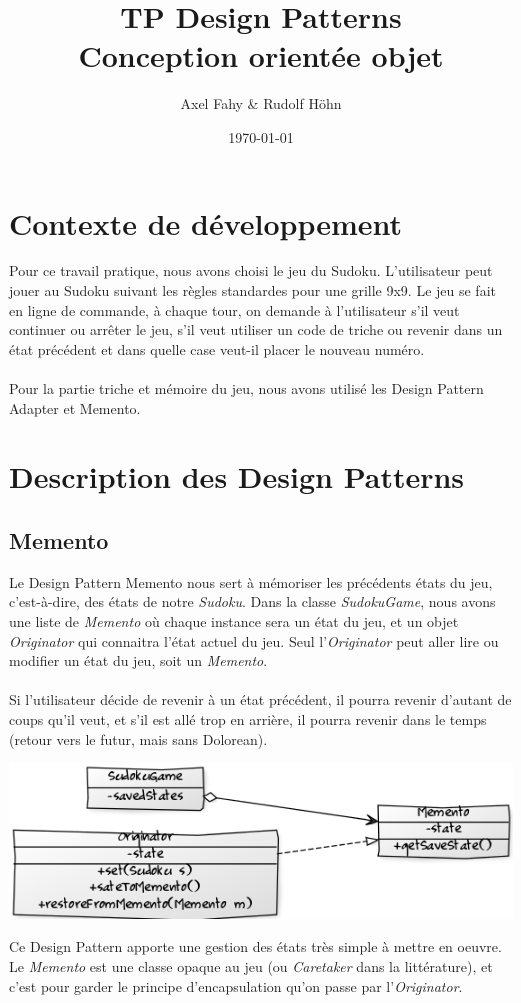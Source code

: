 \documentclass[a4paper]{article}
\title{TP Design Patterns\\Conception orientée objet}
\author{Axel Fahy \& Rudolf Höhn}
\date{\today}
\begin{document}
\maketitle

\section{Contexte de développement}
Pour ce travail pratique, nous avons choisi le jeu du Sudoku.
L'utilisateur peut jouer au Sudoku suivant les règles standardes pour une grille 9x9.
Le jeu se fait en ligne de commande, à chaque tour, on demande à l'utilisateur s'il veut continuer ou arrêter le jeu,
s'il veut utiliser un code de triche ou revenir dans un état précédent et dans quelle case veut-il placer le nouveau numéro.
\\\\
Pour la partie triche et mémoire du jeu, nous avons utilisé les Design Pattern Adapter et Memento.

\section{Description des Design Patterns}

\subsection{Memento}
Le Design Pattern Memento nous sert à mémoriser les précédents états du jeu, c'est-à-dire, des états de notre \textit{Sudoku}.
Dans la classe \textit{SudokuGame}, nous avons une liste de \textit{Memento} où chaque instance sera un état du jeu, et un objet \textit{Originator} qui connaitra l'état actuel du jeu.
Seul l'\textit{Originator} peut aller lire ou modifier un état du jeu, soit un \textit{Memento}.\\\\
Si l'utilisateur décide de revenir à un état précédent, il pourra revenir d'autant de coups qu'il veut, et s'il est allé trop en arrière, il pourra revenir dans le temps (retour vers le futur, mais sans Dolorean).
\begin{center}
\includegraphics[scale=0.7]{../memento.png}
\end{center}
Ce Design Pattern apporte une gestion des états très simple à mettre en oeuvre.
Le \textit{Memento} est une classe opaque au jeu (ou \textit{Caretaker} dans la littérature), et c'est pour garder le principe d'encapsulation qu'on passe par l'\textit{Originator}.
\newpage
\end{document}

